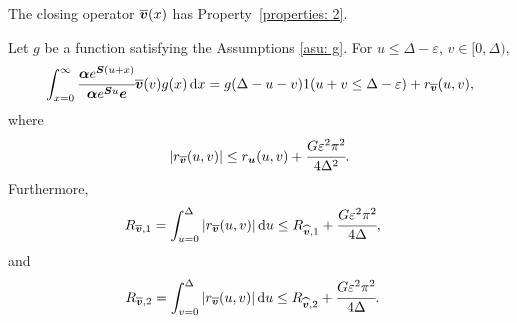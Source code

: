 \begin{cor}\label{cor: cond bnd 2 U2}
	The closing operator \(\overline{\boldsymbol v}(x)\) has Property~\ref{properties: 2}.

	Let \(g\) be a function satisfying the Assumptions \ref{asu: g}. For \(u\leq \Delta-\varepsilon \), \(v\in[ 0,\Delta)\), 
	\[\int_{x=0}^\infty \cfrac{\boldsymbol \alpha  e^{\boldsymbol{S} (u+x)} }{\boldsymbol \alpha  e^{\boldsymbol{S} u} \boldsymbol e} \overline{\boldsymbol v}(v)g(x)\, \mathrm{d} x = g(\Delta-u-v) 1(u+v\leq\Delta-\varepsilon) + r_{\overline{\boldsymbol v}} (u,v),\]
	where 
	\[\left|r_{\overline{\boldsymbol v}} (u,v)\right|\leq r_{\boldsymbol u} (u,v) + \cfrac{G \varepsilon^2 \pi^2}{4\Delta^2}.\]
	Furthermore,  
	\begin{align*}
		R_{{\overline{\boldsymbol v}},1}&=\int_{u=0}^{\Delta}| r_{\overline{\boldsymbol v}}(u,v)|\, \mathrm{d} u\leq R_{{\widehat{\boldsymbol v}},1} + \cfrac{G \varepsilon^2 \pi^2}{4\Delta},
	\end{align*}
	and
	\begin{align*}
		R_{{\overline{\boldsymbol v}},2}&=\int_{v=0}^{\Delta}| r_{\overline{\boldsymbol v}}(u,v)|\, \mathrm{d} u\leq R_{{\widehat{\boldsymbol v}},2} + \cfrac{G \varepsilon^2 \pi^2}{4\Delta}.
	\end{align*}
\end{cor}
